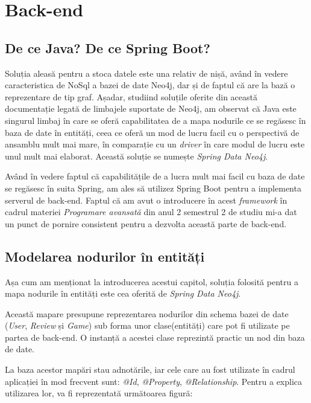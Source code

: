 \documentclass[12pt,a4paper]{report}
\begin{document}
\section{Back-end}

\subsection{De ce Java? De ce Spring Boot?}

Soluția aleasă pentru a stoca datele este una relativ de nișă, având în vedere caracteristica de NoSql a bazei de date Neo4j, dar și de faptul că are la bază o reprezentare de tip graf. Așadar, studiind soluțile oferite din această documentație \cite{20} legată de limbajele suportate de Neo4j, am observat că Java este singurul limbaj în care se oferă capabilitatea de a mapa nodurile ce se regăsesc în baza de date în entități, ceea ce oferă un mod de lucru facil cu o perspectivă de ansamblu mult mai mare, în comparație cu un \emph{driver} în care modul de lucru este unul mult mai elaborat. Această soluție se numește \emph{Spring Data Neo4j}. \cite{21}

Având în vedere faptul că capabilitățile de a lucra mult mai facil cu baza de date se regăsesc în suita Spring, am ales să utilizez Spring Boot pentru a implementa serverul de back-end. Faptul că am avut o introducere în acest \emph{framework} în cadrul materiei \emph{Programare avansată} din anul 2 semestrul 2 de studiu mi-a dat un punct de pornire consistent pentru a dezvolta această parte de back-end.


\subsection{Modelarea nodurilor în entități}

Așa cum am menționat la introducerea acestui capitol, soluția folosită pentru a mapa nodurile în entități este cea oferită de \emph{Spring Data Neo4j}.

Această mapare presupune reprezentarea nodurilor din schema bazei de date (\emph{User}, \emph{Review} și \emph{Game}) sub forma unor clase(entități) care pot fi utilizate pe partea de back-end. O instanță a acestei clase reprezintă practic un nod din baza de date.

La baza acestor mapări stau adnotările, iar cele care au fost utilizate în cadrul aplicației în mod frecvent sunt: \emph{@Id}, \emph{@Property}, \emph{@Relationship}. Pentru a explica utilizarea lor, va fi reprezentată următoarea figură:
\end{document}
